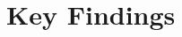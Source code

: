 \documentclass[12pt]{amsart}
\newcommand{\x}{\mathbf{x}}
\renewcommand{\c}{\mathbf{c}}
\DeclareMathOperator*{\argmin}{argmin}
\begin{document}
\section{Key Findings}
\label{sec:results}
% 
% 
% 
\end{document}
